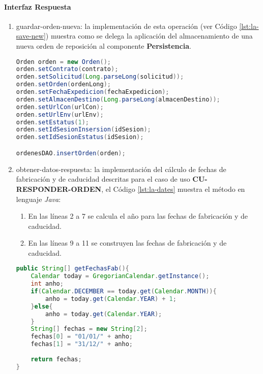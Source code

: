 \paragraph{\indent Interfaz Respuesta}
\begin{enumerate}
	\item guardar-orden-nueva: la implementación de esta operación (ver Código \ref{lst:la-save-new}) muestra como se delega la aplicación del almacenamiento de una nueva orden de reposición al componente \textbf{Persistencia}.
	\begin{lstlisting}[language=Java, caption={Delegación del almacenamiento de una nueva orden de reposición.}, captionpos=b, label={lst:la-save-new}]
Orden orden = new Orden();
orden.setContrato(contrato);
orden.setSolicitud(Long.parseLong(solicitud));
orden.setOrden(ordenLong);
orden.setFechaExpedicion(fechaExpedicion);
orden.setAlmacenDestino(Long.parseLong(almacenDestino));
orden.setUrlCon(urlCon);
orden.setUrlEnv(urlEnv);
orden.setEstatus(1);
orden.setIdSesionInsersion(idSesion);
orden.setIdSesionEstatus(idSesion);

ordenesDAO.insertOrden(orden);
	\end{lstlisting}

	\item obtener-datos-respuesta: la implementación del cálculo de fechas de fabricación y de caducidad descritas para el caso de uso \textbf{CU-RESPONDER-ORDEN}, el Código \ref{lst:la-dates} muestra el método en lenguaje \textit{Java}:
	\begin{enumerate}
		\item En las líneas 2 a 7 se calcula el año para las fechas de fabricación y de caducidad.
		\item En las líneas 9 a 11 se construyen las fechas de fabricación y de caducidad.
	\end{enumerate}
	\begin{lstlisting}[language=Java, caption={Método para calcular las fechas de fabricación y caducidad.}, captionpos=b, label={lst:la-dates}]
public String[] getFechasFab(){
	Calendar today = GregorianCalendar.getInstance();
	int anho;
	if(Calendar.DECEMBER == today.get(Calendar.MONTH)){
		anho = today.get(Calendar.YEAR) + 1;
	}else{
		anho = today.get(Calendar.YEAR);
	}
	String[] fechas = new String[2];
	fechas[0] = "01/01/" + anho;
	fechas[1] = "31/12/" + anho;
	
	return fechas;
}
	\end{lstlisting}


\end{enumerate}
